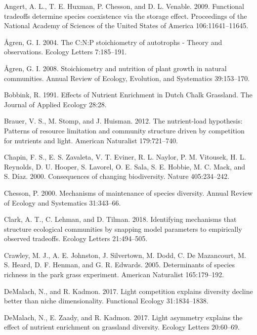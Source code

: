 \documentclass[twoside,12pt,final]{ucthesis-CA2012}
\begin{document}
\begin{ucmainmatter}
\leavevmode\hypertarget{ref-Angert2009}{}%
Angert, A. L., T. E. Huxman, P. Chesson, and D. L. Venable. 2009. Functional tradeoffs determine species coexistence via the storage effect. Proceedings of the National Academy of Sciences of the United States of America 106:11641--11645.

\leavevmode\hypertarget{ref-Agren2004}{}%
Ågren, G. I. 2004. The C:N:P stoichiometry of autotrophs - Theory and observations. Ecology Letters 7:185--191.

\leavevmode\hypertarget{ref-Agren2008}{}%
Ågren, G. I. 2008. Stoichiometry and nutrition of plant growth in natural communities. Annual Review of Ecology, Evolution, and Systematics 39:153--170.

\leavevmode\hypertarget{ref-Bobbink1991}{}%
Bobbink, R. 1991. Effects of Nutrient Enrichment in Dutch Chalk Grassland. The Journal of Applied Ecology 28:28.

\leavevmode\hypertarget{ref-Brauer2012}{}%
Brauer, V. S., M. Stomp, and J. Huisman. 2012. The nutrient-load hypothesis: Patterns of resource limitation and community structure driven by competition for nutrients and light. American Naturalist 179:721--740.

\leavevmode\hypertarget{ref-Chapin2000}{}%
Chapin, F. S., E. S. Zavaleta, V. T. Eviner, R. L. Naylor, P. M. Vitousek, H. L. Reynolds, D. U. Hooper, S. Lavorel, O. E. Sala, S. E. Hobbie, M. C. Mack, and S. Díaz. 2000. Consequences of changing biodiversity. Nature 405:234--242.

\leavevmode\hypertarget{ref-Chesson2000}{}%
Chesson, P. 2000. Mechanisms of maintenance of species diversity. Annual Review of Ecology and Systematics 31:343--66.

\leavevmode\hypertarget{ref-Clark2018}{}%
Clark, A. T., C. Lehman, and D. Tilman. 2018. Identifying mechanisms that structure ecological communities by snapping model parameters to empirically observed tradeoffs. Ecology Letters 21:494--505.

\leavevmode\hypertarget{ref-Crawley2005}{}%
Crawley, M. J., A. E. Johnston, J. Silvertown, M. Dodd, C. De Mazancourt, M. S. Heard, D. F. Henman, and G. R. Edwards. 2005. Determinants of species richness in the park grass experiment. American Naturalist 165:179--192.

\leavevmode\hypertarget{ref-DeMalach2017b}{}%
DeMalach, N., and R. Kadmon. 2017. Light competition explains diversity decline better than niche dimensionality. Functional Ecology 31:1834--1838.

\leavevmode\hypertarget{ref-DeMalach2017a}{}%
DeMalach, N., E. Zaady, and R. Kadmon. 2017. Light asymmetry explains the effect of nutrient enrichment on grassland diversity. Ecology Letters 20:60--69.


\end{ucmainmatter}
\end{document}
